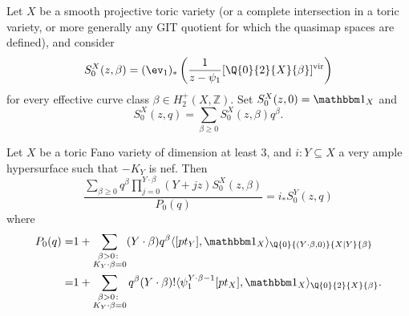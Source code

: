 \begin{dfn}
 Let $X$ be a smooth projective toric variety (or a complete intersection in a toric variety, or more generally any GIT quotient for which the quasimap spaces are defined), and consider 
 \[
  S_0^X(z,\beta)=(\ev_1)_*\left(\frac{1}{z-\psi_1}[\Q{0}{2}{X}{\beta}]^\text{vir}\right)
 \]
 for every effective curve class $\beta\in H_2^+(X,\mathbb Z)$. Set $S_0^X(z,0)= \mathbbm 1_X$ and
 \[
  S_0^X(z,q)=\sum_{\beta\geq 0}S_0^X(z,\beta) q^\beta.
 \]
\end{dfn}

\begin{thm}
Let $X$ be a toric Fano variety of dimension at least 3, and $i\colon Y\subseteq X$ a very ample hypersurface such that $-K_Y$ is nef. Then
\begin{equation}\label{eqn:mirror}
   \frac{\sum_{\beta\geq 0} q^\beta\prod_{j=0}^{Y\cdot\beta}(Y+jz)S_0^X(z,\beta)}{P_0(q)}= i_*S_0^Y(z,q)
\end{equation}
where
\begin{align*}
 P_0(q)= & 1+\sum_{\substack{\beta>0\colon \\ K_Y\cdot\beta=0}} (Y\cdot\beta)q^\beta\langle [pt_Y],\mathbbm 1_{X}\rangle_{\Q{0}{(Y \cdot \beta,0)}{X|Y}{\beta}} \\
 = & 1+\sum_{\substack{\beta>0\colon \\ K_Y\cdot\beta=0}} q^\beta(Y\cdot\beta)!\langle\psi_1^{Y\cdot\beta-1}[pt_X],\mathbbm 1_{X}\rangle_{\Q{0}{2}{X}{\beta}}.
\end{align*}
\end{thm}


